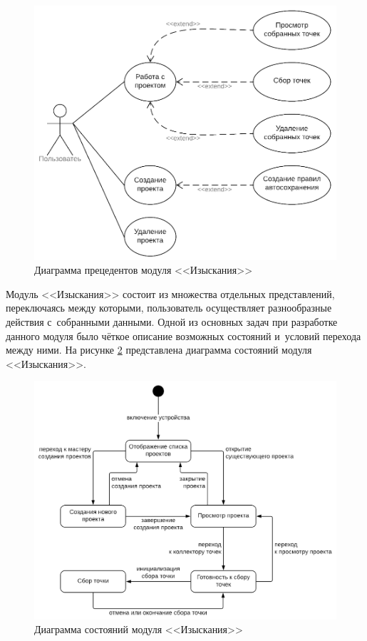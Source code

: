 \begin{figure}[h!]
  \centering
  \setlength{\fboxsep}{5pt}
  \includegraphics[width=.8\textwidth]{img/uml/survey_usecase}
  \vspace*{6pt}
  \caption{Диаграмма прецедентов модуля <<Изыскания>>}
  \label{fig:survey-uml-usecase}
\end{figure}

Модуль <<Изыскания>> состоит из множества отдельных представлений, переключаясь между которыми, пользователь осуществляет разнообразные действия с~собранными данными. Одной из основных задач при разработке данного модуля было чёткое описание возможных состояний и~условий перехода между ними. На рисунке \ref{fig:survey-uml-state} представлена диаграмма состояний модуля <<Изыскания>>.

\begin{figure}[h!]
  \centering
  \setlength{\fboxsep}{5pt}
  \includegraphics[width=.8\textwidth]{img/uml/survey_state}
  \caption{Диаграмма состояний модуля <<Изыскания>>}
  \label{fig:survey-uml-state}
\end{figure}

